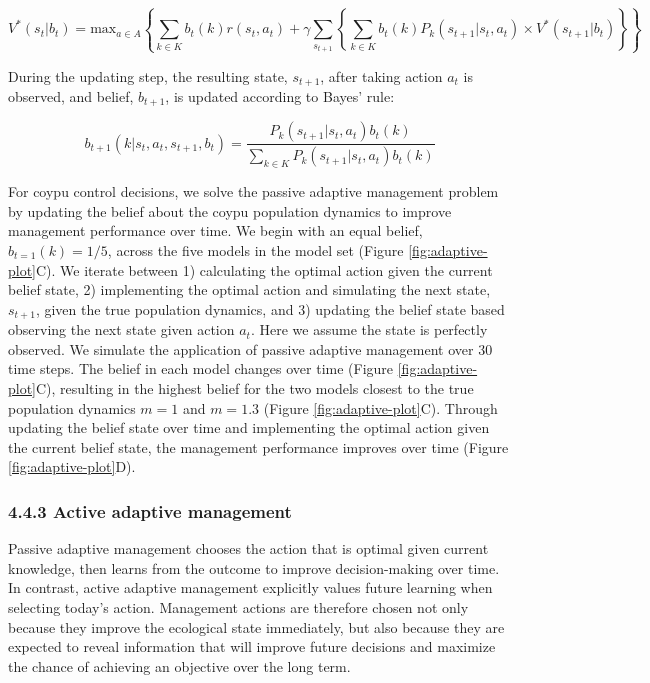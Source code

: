 \documentclass[
  11pt,
  a4paper,
]{article}
\begin{document}
\[
V^*(s_t|b_t) = \text{max}_{a \in A} \left\{ \sum_{k \in K}b_t(k)r(s_t, a_t) + \gamma \sum_{s_{t+1}} \left\{\sum_{k\in K}b_t(k)P_k(s_{t+1}|s_t, a_t) \times V^*(s_{t+1}|b_t)\right\} \right\}
\]

During the updating step, the resulting state, \(s_{t+1}\), after taking action \(a_t\) is observed, and belief, \(b_{t+1}\), is updated according to Bayes' rule:

\[
b_{t+1}(k|s_t, a_t, s_{t+1}, b_t) = \frac{P_k(s_{t+1}|s_t,a_t)b_t(k)}{\sum_{k \in K}P_k(s_{t+1}|s_t,a_t)b_t(k)}
\]

For coypu control decisions, we solve the passive adaptive management problem by updating the belief about the coypu population dynamics to improve management performance over time. We begin with an equal belief, \(b_{t=1}(k) = 1 / 5\), across the five models in the model set (Figure \ref{fig:adaptive-plot}C). We iterate between 1) calculating the optimal action given the current belief state, 2) implementing the optimal action and simulating the next state, \(s_{t+1}\), given the true population dynamics, and 3) updating the belief state based observing the next state given action \(a_t\). Here we assume the state is perfectly observed. We simulate the application of passive adaptive management over 30 time steps. The belief in each model changes over time (Figure \ref{fig:adaptive-plot}C), resulting in the highest belief for the two models closest to the true population dynamics \(m = 1\) and \(m = 1.3\) (Figure \ref{fig:adaptive-plot}C). Through updating the belief state over time and implementing the optimal action given the current belief state, the management performance improves over time (Figure \ref{fig:adaptive-plot}D).

\subsubsection{4.4.3 Active adaptive management}\label{active-adaptive-management}

Passive adaptive management chooses the action that is optimal given current knowledge, then learns from the outcome to improve decision-making over time. In contrast, active adaptive management explicitly values future learning when selecting today's action. Management actions are therefore chosen not only because they improve the ecological state immediately, but also because they are expected to reveal information that will improve future decisions and maximize the chance of achieving an objective over the long term.
\end{document}
